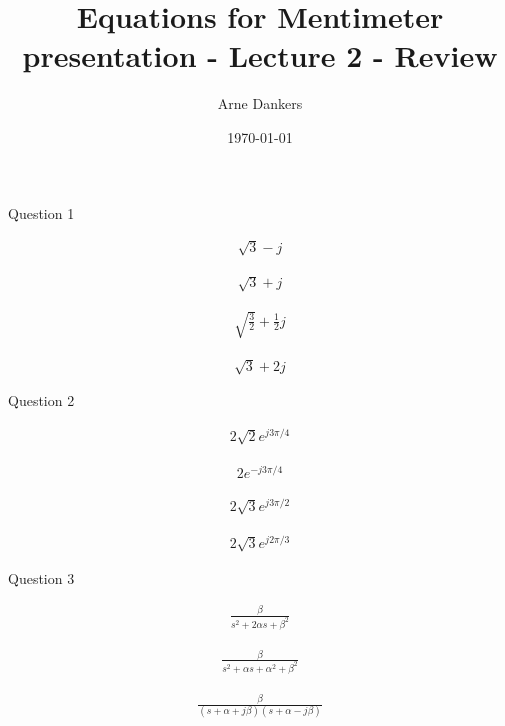 \documentclass[12pt]{article}
\title{Equations for Mentimeter presentation - Lecture 2 - Review}
\date{\today}
\author{Arne Dankers}
\begin{document}
Question 1 

\begin{align*}
    \sqrt{3} - j
\end{align*}

\begin{align*}
    \sqrt{3} + j
\end{align*}
    
\begin{align*}
    \sqrt{\frac{3}{2}} + \frac{1}{2}j     
\end{align*}
        
\begin{align*}           
    \sqrt{3} + 2j           
\end{align*}

Question 2 

\begin{align*}           
    2\sqrt{2}e^{j 3 \pi/ 4}           
\end{align*}

\begin{align*}           
    2e^{-j 3 \pi/ 4}        
\end{align*}

\begin{align*}           
    2\sqrt{3}e^{j 3 \pi/ 2}          
\end{align*}

\begin{align*}           
    2\sqrt{3}e^{j 2 \pi/ 3}          
\end{align*}

Question 3

\vspace{2cm}

\begin{align*}
    \frac{\beta}{s^2 + 2\alpha s + \beta^2}
\end{align*}

\vspace{2cm}


\begin{align*}
    \frac{\beta}{s^2 + \alpha s + \alpha^2 + \beta^2}
\end{align*}


\vspace{2cm}


\begin{align*}
    \frac{\beta}{(s+\alpha+j\beta)(s+\alpha-j\beta)}
\end{align*}


\vspace{2cm}
\end{document}

